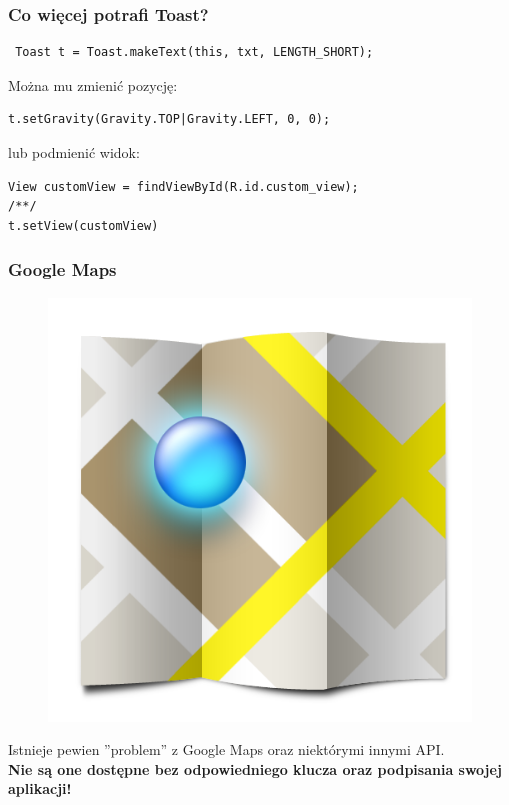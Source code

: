 \documentclass{beamer}
\begin{document}
\begin{frame}[fragile]
\frametitle{Co więcej potrafi Toast?}
\begin{lstlisting}
 Toast t = Toast.makeText(this, txt, LENGTH_SHORT);
\end{lstlisting}

\pause

Można mu zmienić pozycję:
\begin{lstlisting}
t.setGravity(Gravity.TOP|Gravity.LEFT, 0, 0);
\end{lstlisting}

\pause

lub podmienić widok:
\begin{lstlisting}
View customView = findViewById(R.id.custom_view);
/**/
t.setView(customView)
 \end{lstlisting}

\end{frame}


\begin{frame}\frametitle{Google Maps}

\begin{figure}[tc]
  \centering
  \includegraphics[height=0.45\textheight,keepaspectratio=true]{images/maps_icon}
\end{figure}

Istnieje pewien ''problem'' z Google Maps oraz niektórymi innymi API. \\
\textbf{Nie są one dostępne bez odpowiedniego klucza oraz podpisania swojej aplikacji!}
\end{frame}
\end{document}
